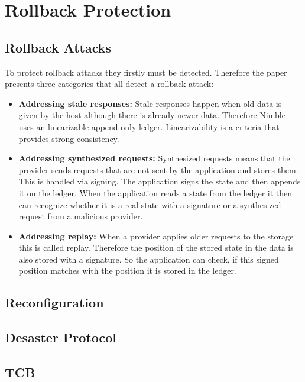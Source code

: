 \section{Rollback Protection}

\subsection{Rollback Attacks}
To protect rollback attacks they firstly must be detected. Therefore the paper presents three categories that all detect a rollback attack:
		\begin{itemize}
			\item \textbf{Addressing stale responses:} Stale responses happen when old data is given by the host although there is already newer data. Therefore Nimble uses an linearizable append-only ledger. Linearizability is a criteria that provides strong consistency. 
			\item \textbf{Addressing synthesized requests:} Synthesized requests means that the provider sends requests that are not sent by the application and stores them. This is handled via signing. The application signs the state and then appends it on the ledger. When the application reads a state from the ledger it then can recognize whether it is a real state with a signature or a synthesized request from a malicious provider.
			\item \textbf{Addressing replay:} When a provider applies older requests to the storage this is called replay. Therefore the position of the stored state in the data is also stored with a signature. So the application can check, if this signed position matches with the position it is stored in the ledger.
		\end{itemize}
\subsection{Reconfiguration}
\label{reconNimble}
\subsection{Desaster Protocol}
\subsection{TCB}